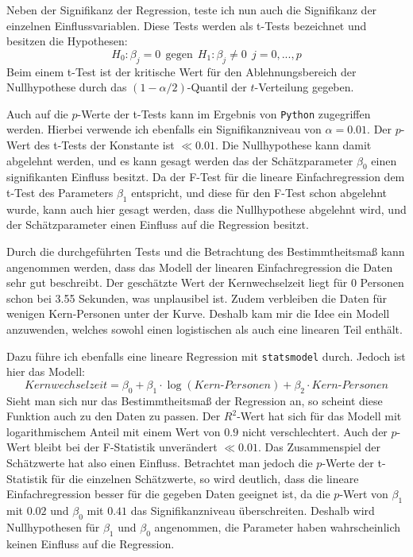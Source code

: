 Neben der Signifikanz der Regression, teste ich nun auch die Signifikanz der einzelnen Einflussvariablen. Diese Tests werden als t-Tests bezeichnet und besitzen die Hypothesen:
$$ H_0:\beta_j = 0 \ \ \text{gegen} \ \ H_1: \beta_j \neq 0 \ \ j = 0, ..., p$$
Beim einem t-Test ist der kritische Wert für den Ablehnungsbereich der Nullhypothese durch das $(1-\alpha/2)$-Quantil der $t$-Verteilung gegeben.

Auch auf die $p$-Werte der t-Tests kann im Ergebnis von \texttt{Python} zugegriffen werden. Hierbei verwende ich ebenfalls ein Signifikanzniveau von $\alpha = 0.01$. Der $p$-Wert des t-Tests der Konstante ist $\ll 0.01$. Die Nullhypothese kann damit abgelehnt werden, und es kann gesagt werden das der Schätzparameter $\beta_0$ einen signifikanten Einfluss besitzt. Da der F-Test für die lineare Einfachregression dem t-Test des Parameters $\beta_1$ entspricht, und diese für den F-Test schon abgelehnt wurde, kann auch hier gesagt werden, dass die Nullhypothese abgelehnt wird, und der Schätzparameter einen Einfluss auf die Regression besitzt.

Durch die durchgeführten Tests und die Betrachtung des Bestimmtheitsmaß kann angenommen werden, dass das Modell der linearen Einfachregression die Daten sehr gut beschreibt. Der geschätzte Wert der Kernwechselzeit liegt für 0 Personen schon bei 3.55 Sekunden, was unplausibel ist. Zudem verbleiben die Daten für wenigen Kern-Personen unter der Kurve. Deshalb kam mir die Idee ein Modell anzuwenden, welches sowohl einen logistischen als auch eine linearen Teil enthält.

Dazu führe ich ebenfalls eine lineare Regression mit \texttt{statsmodel} durch. Jedoch ist hier das Modell:
\begin{equation}
Kernwechselzeit = \beta_0 + \beta_1 \cdot \log(Kern\text{-}Personen) + \beta_2 \cdot Kern\text{-}Personen
\end{equation}
Sieht man sich nur das Bestimmtheitsmaß der Regression an, so scheint diese Funktion auch zu den Daten zu passen. Der $R^2$-Wert hat sich für das Modell mit logarithmischem Anteil mit einem Wert von $0.9$ nicht verschlechtert. Auch der $p$-Wert bleibt bei der F-Statistik unverändert $\ll 0.01$. Das Zusammenspiel der Schätzwerte hat also einen Einfluss. Betrachtet man jedoch die $p$-Werte der t-Statistik für die einzelnen Schätzwerte, so wird deutlich, dass die lineare Einfachregression besser für die gegeben Daten geeignet ist, da die $p$-Wert von $\beta_1$ mit $0.02$ und $\beta_0$ mit $0.41$ das Signifikanzniveau überschreiten. Deshalb wird Nullhypothesen für $\beta_1$ und $\beta_0$ angenommen, die Parameter haben wahrscheinlich keinen Einfluss auf die Regression.

